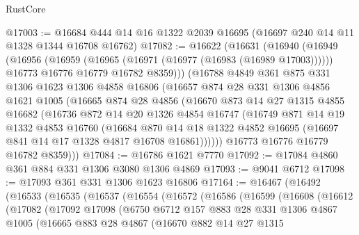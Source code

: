 \begin{lexlean}{RustCore}
\begin{coremodule}
@17003 := @16684 @444 @14 @16 @1322 @2039 @16695 (@16697 @240 @14 @11 @1328 @1344 @16708 @16762)
@17082 := @16622
    (@16631
      (@16940
        (@16949
          (@16956
            (@16959 (@16965 (@16971 (@16977 (@16983 (@16989 @17003))))))
            @16773
            @16776
            @16779
            @16782
            @8359)))
      (@16788
        @4849
        @361
        @875
        @331
        @1306
        @1623
        @1306
        @4858
        @16806
        (@16657
          @874
          @28
          @331
          @1306
          @4856
          @1621
          @1005
          (@16665
            @874
            @28
            @4856
            (@16670
              @873
              @14
              @27
              @1315
              @4855
              @16682
              (@16736
                @872
                @14
                @20
                @1326
                @4854
                @16747
                (@16749
                  @871
                  @14
                  @19
                  @1332
                  @4853
                  @16760
                  (@16684
                    @870
                    @14
                    @18
                    @1322
                    @4852
                    @16695
                    (@16697 @841 @14 @17 @1328 @4817 @16708 @16861))))))
          @16773
          @16776
          @16779
          @16782
          @8359)))
@17084 := @16786 @1621 @7770
@17092 := @17084 @4860 @361 @884 @331 @1306 @3080 @1306 @4869
@17093 := @9041 @6712
@17098 := @17093 @361 @331 @1306 @1623 @16806
@17164 := @16467
    (@16492
      (@16533
        (@16535
          (@16537
            (@16554
              (@16572
                (@16586
                  (@16599
                    (@16608
                      (@16612
                        (@17082
                          (@17092
                            @17098
                            (@6750
                              @6712
                              @157
                              @883
                              @28
                              @331
                              @1306
                              @4867
                              @1005
                              (@16665
                                @883
                                @28
                                @4867
                                (@16670
                                  @882
                                  @14
                                  @27
                                  @1315

\end{coremodule}
\end{lexlean}
